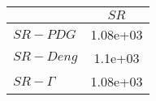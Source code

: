 \begin{tabular}{l|c}
\toprule
{} &     $SR$ \\
\midrule
\textbf{$SR-PDG$   } & 1.08e+03 \\
\textbf{$SR-Deng$  } &  1.1e+03 \\
\textbf{$SR-\Gamma$} & 1.08e+03 \\
\bottomrule
\end{tabular}
